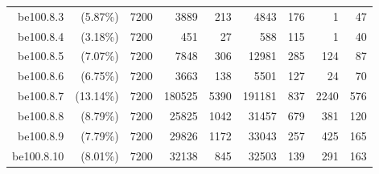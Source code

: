 \documentclass[pdflatex,sn-mathphys-num]{sn-jnl}%
\theoremstyle{thmstyleone}%
\theoremstyle{thmstyletwo}%
\theoremstyle{thmstylethree}%
\begin{document}
\begin{table}[!h]
{\begin{tabular}{rrrrrrrrr}
		be100.8.3 &(5.87\%) &7200 &3889 &213 &4843 &176 &1 &47  \\
		be100.8.4 &(3.18\%) &7200 &451 &27 &588 &115 &1 &40  \\
		be100.8.5 &(7.07\%) &7200 &7848 &306 &12981 &285 &124 &87  \\
		be100.8.6 &(6.75\%) &7200 &3663 &138 &5501 &127 &24 &70  \\
		be100.8.7 &(13.14\%) &7200 &180525 &5390 &191181 &837 &2240 &576  \\
		be100.8.8 &(8.79\%) &7200 &25825 &1042 &31457 &679 &381 &120  \\
		be100.8.9 &(7.79\%) &7200 &29826 &1172 &33043 &257 &425 &165  \\
		be100.8.10 &(8.01\%) &7200 &32138 &845 &32503 &139 &291 &163  \\
		\bottomrule
	\end{tabular}
}
\end{table}		
\end{document}
